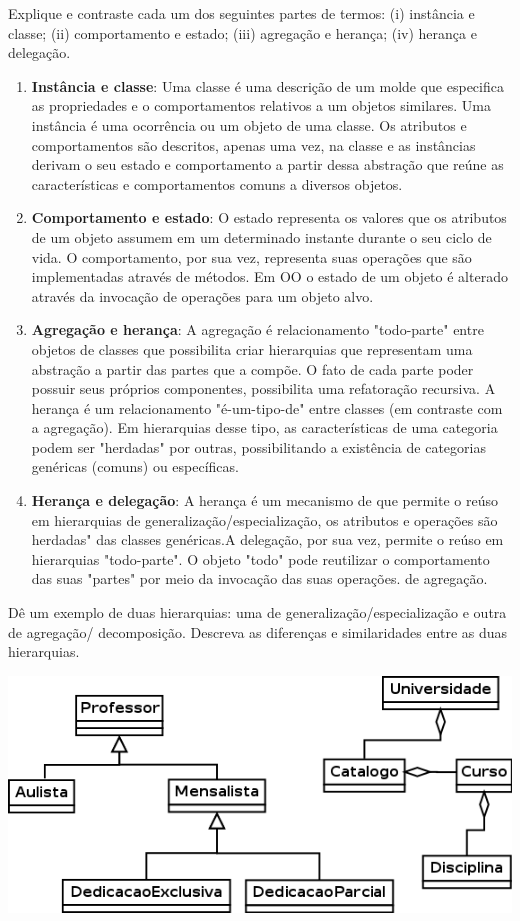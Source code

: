 \documentclass[12pt]{exam}
\begin{document}
  \begin{questions}
    \question Explique e contraste cada um dos seguintes partes de termos: (i) instância e classe; (ii) comportamento e estado; (iii) agregação e herança; 
    (iv) herança e delegação.  
    \begin{solution}
      \begin{enumerate}[(i.)]
       \item \textbf{Instância e classe}: Uma classe é uma descrição de um molde que especifica as propriedades e o comportamentos relativos a um objetos similares. Uma instância 
	é uma ocorrência ou um objeto de uma classe. Os atributos e comportamentos são descritos, apenas uma vez, na classe e as instâncias derivam o seu estado e
	comportamento a partir dessa abstração que reúne as características e comportamentos comuns a diversos objetos.
       \item \textbf{Comportamento e estado}: O estado representa os valores que os atributos de um objeto assumem em um determinado instante durante o seu ciclo de vida. 
	O comportamento, por sua vez, representa suas operações que são implementadas através de métodos. Em OO o estado de um objeto é alterado através da invocação 
	de operações para um objeto alvo.
       \item \textbf{Agregação e herança}: A agregação é relacionamento "todo-parte" entre objetos de classes que possibilita criar hierarquias que representam uma abstração 
	a partir das partes que a compõe. O fato de cada parte poder possuir seus próprios componentes, possibilita uma refatoração recursiva. A herança é um relacionamento "é-um-tipo-de" 
	entre classes (em contraste com a agregação). Em hierarquias desse tipo, as características de uma categoria podem ser "herdadas" por outras, possibilitando a 
	existência de categorias genéricas (comuns) ou específicas. 
       \item \textbf{Herança e delegação}: A herança é um mecanismo de que permite o reúso em hierarquias de generalização/especialização, os atributos e operações são herdadas" das
        classes genéricas.A delegação, por sua vez, permite o reúso em hierarquias "todo-parte". O objeto "todo" pode reutilizar o comportamento  das suas "partes" por meio da invocação das suas operações.
	de agregação.
      \end{enumerate}
    \end{solution}

    \question 
      Dê um exemplo de duas hierarquias: uma de generalização/especialização e outra de agregação/ decomposição. Descreva as 
      diferenças e similaridades entre as duas hierarquias.
    \begin{solution}
      \begin{center}
	\includegraphics[width=.5\textwidth]{./exercicios-capitulo1-e2.png}
      \end{center}
      

\end{solution}
\end{questions}
\end{document}
